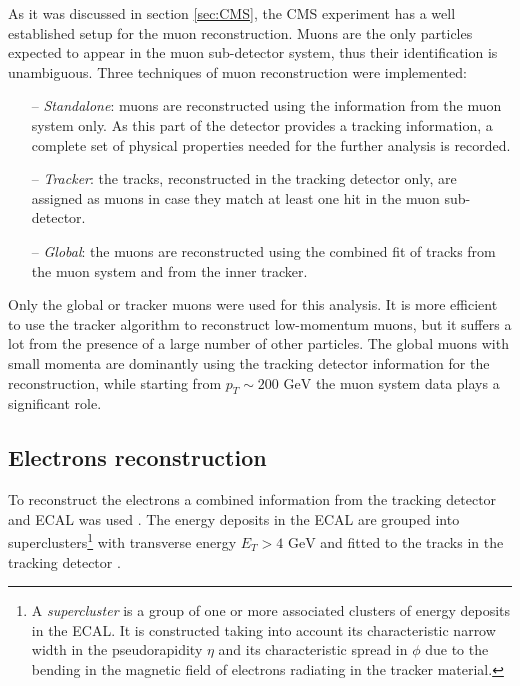 As it was discussed in section \ref{sec:CMS}, the CMS experiment has a well established setup for the muon reconstruction.
Muons are the only particles expected to appear in the muon sub-detector system, thus their identification is unambiguous.
Three techniques of muon reconstruction were implemented:

\begin{itemize}
 \item [--] \textit{Standalone}: muons are reconstructed using the information from the muon system only. As 
 this part of the detector provides a tracking information, a complete set of physical properties needed for the further
 analysis is recorded.
 
 \item [--] \textit{Tracker}: the tracks, reconstructed in the tracking detector only, are assigned as muons in case they 
 match at least one hit in the muon sub-detector. 
 
 \item [--] \textit{Global}: the muons are reconstructed using 
 the combined fit of tracks from the muon system and from the inner tracker.
\end{itemize}

Only the global or tracker muons were used for this analysis. It is more efficient to use the tracker algorithm to reconstruct
low-momentum muons, but it suffers a lot from the presence of a large number of other particles. The global muons with small momenta
are dominantly using the tracking detector information for the reconstruction, while starting from $p_{T} \sim \textrm{200 GeV}$
the muon system data plays a significant role.

\subsection{Electrons reconstruction}

To reconstruct the electrons a combined information from the tracking detector and ECAL was used \cite{CMS-PAS-EGM-10-004}. The energy
deposits in the ECAL are grouped into superclusters\footnote{A \textit{supercluster} is  a group of one or more associated clusters 
of energy deposits in the ECAL. It is constructed taking into account its characteristic narrow width in the pseudorapidity $\eta$
and its characteristic spread in $\phi$ due to the bending in the magnetic field of electrons radiating in the tracker material.} 
with transverse energy $E_{T} > \textrm{4 GeV}$ and fitted to the tracks in the tracking detector \cite{GSF_Electron_Reconstruction_CMS}.

